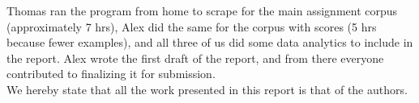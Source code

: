 \documentclass[10pt]{article}
\begin{document}
\begin{multicols}{2}
Thomas ran the program from home to scrape for the main assignment corpus (approximately 7 hrs), Alex did the same for the corpus with scores (5 hrs because fewer examples), and all three of us did some data analytics to include in the report. Alex wrote the first draft of the report, and from there everyone contributed to finalizing it for submission.\\

We hereby state that all the work presented in this report is that of the authors.












\end{multicols}
\end{document}

